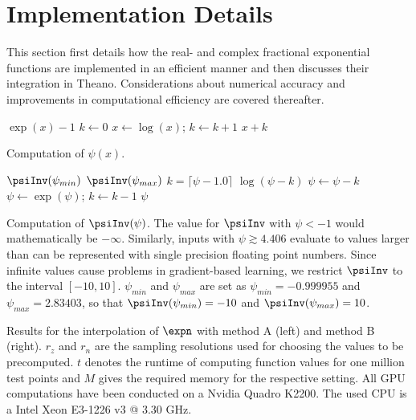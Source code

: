 \section{Implementation Details}\label{ch:impl}

This section first details how the real- and complex fractional exponential functions are implemented in an efficient manner and then discusses their integration in Theano. 
Considerations about numerical accuracy and improvements in computational efficiency are covered thereafter. 

\begin{algorithm}
\begin{algorithmic}
	\Return $\exp(x) -1$
\Else
	\State $k \gets 0$
        		\State $x \gets \log(x)$;  $k \gets k +1$	
        \EndWhile
         \State \Return $x + k$
\EndIf
\end{algorithmic}
\caption{Computation of $\psi(x)$.}
\label{alg:psi}
\end{algorithm}
\begin{algorithm}
\begin{algorithmic}
    \Return $\psiInv(\psi_{min})$ %
    \Return $\psiInv(\psi_{max})$ %
    \Else
        \State $k = \lceil \psi - 1.0 \rceil$
			\State	\Return $\log(\psi - k)$
        \EndIf
        \State $\psi \gets \psi - k$
        		\State $\psi \gets \exp(\psi)$;  $k \gets k -1$	
        \EndWhile
        \State \Return $\psi$
\EndIf
\end{algorithmic}
\caption{Computation of $\psiInv(\psi)$. 
The value for $\psiInv$ with $\psi < -1$ would mathematically be $-\infty$. 
Similarly, inputs with $\psi \gtrsim 4.406$ evaluate to values larger than can be represented with single precision floating point numbers. 
Since infinite values cause problems in gradient-based learning, we restrict $\psiInv$ to the interval $\left[-10,10\right]$. 
$\psi_{min}$ and $\psi_{max}$ are set as $\psi_{min}=-0.999955$ and $\psi_{max}=2.83403$, so that $\psiInv(\psi_{min})=-10$ and $\psiInv(\psi_{max})=10$.}
\label{alg:psiInv}
\end{algorithm}

\begin{table*}
\centering

\hspace{\columnsep}

\caption{Results for the interpolation of $\expn$ with method A (left) and method B (right). $r_{z}$ and $r_{n}$ are the sampling resolutions used for choosing the values to be precomputed. $t$ denotes the runtime of computing function values for one million test points and $M$ gives the required memory for the respective setting.
All GPU computations have been conducted on a Nvidia Quadro K2200. The used CPU is a Intel Xeon E3-1226 v3 @ 3.30 GHz.}
\label{tab:ip}
\end{table*}

